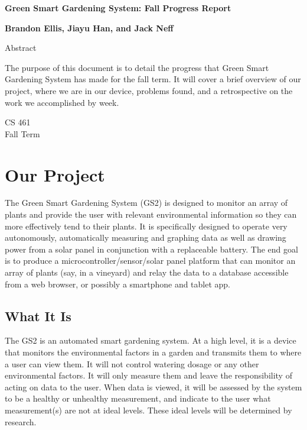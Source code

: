 \documentclass[IEEEtran,letterpaper,10pt,titlepage,fleqn,draftclsnofoot,onecolumn]{article}
\begin{document}
\begin{titlepage}
  \begin{center}
    \vspace{1cm}
    
    \huge
    \textbf{Green Smart Gardening System: Fall Progress Report}
    
    \vspace{1.5cm}
    
    \large
        \textbf{Brandon Ellis, Jiayu Han, and Jack Neff}
    
    \vspace{5cm}
    
    Abstract
    
    \normalsize
    The purpose of this document is to detail the progress that Green Smart Gardening System has made for the fall term. It will cover a brief overview of our project, where we are in our device, problems found, and a retrospective on the work we accomplished by week.
    
    \vfill
    
    \large
        CS 461\\
        Fall Term\\
    \end{center}
\end{titlepage}

\section{Our Project}

The Green Smart Gardening System (GS2) is designed to monitor an array of plants and provide the user with relevant environmental information so they can more effectively tend to their plants. It is specifically designed to operate very autonomously, automatically measuring and graphing data as well as drawing power from a solar panel in conjunction with a replaceable battery. The end goal is to produce a microcontroller/sensor/solar panel platform that can monitor an array of plants (say, in a vineyard) and relay the data to a database accessible from a web browser, or possibly a smartphone and tablet app. 

\subsection{What It Is}

The GS2 is an automated smart gardening system. At a high level, it is a device that monitors the environmental factors in a garden and transmits them to where a user can view them. It will not control watering dosage or any other environmental factors. It will only measure them and leave the responsibility of acting on data to the user. When data is viewed, it will be assessed by the system to be a healthy or unhealthy measurement, and indicate to the user what measurement(s) are not at ideal levels. These ideal levels will be determined by research.
\end{document}
